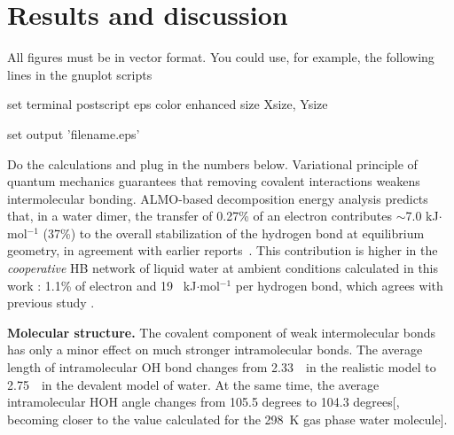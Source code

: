 \documentclass[prl,twocolumn,showpacs]{revtex4}
\begin{document}
\section{Results and discussion}

\new All figures must be in vector format. You could use, for example, the following lines in the gnuplot scripts

set terminal postscript eps color enhanced size Xsize, Ysize

set output 'filename.eps'

\old

\new Do the calculations and plug in the numbers below. \old Variational principle of quantum mechanics guarantees that removing covalent interactions weakens intermolecular bonding. ALMO-based decomposition energy analysis predicts that, in a water dimer, the transfer of 0.27\% of an electron contributes  $\sim$7.0 kJ$\cdot$mol$^{-1}$ (37\%) to the overall stabilization of the hydrogen bond at equilibrium geometry, in agreement with earlier reports~\cite{stevens1987frozen,chen1996energy,piquemal2005csov}. This contribution is higher in the \emph{cooperative} HB network of liquid water at ambient conditions \new calculated in this work \old:  1.1\% of electron and 19 ~kJ$\cdot$mol$^{-1}$ per hydrogen bond, \new which agrees with previous study \old\cite{kuhne2014nature}.

\textbf{Molecular structure.} The covalent component of weak intermolecular bonds has only a minor effect on much stronger intramolecular bonds. The average length of intramolecular OH bond changes from 2.33~\Ang\ in the realistic model to 2.75~\Ang\ in the devalent model of water. At the same time, the average intramolecular HOH angle changes from 105.5 degrees to 104.3 degrees[, becoming closer to the value calculated for the 298~K gas phase water molecule].
\end{document}

